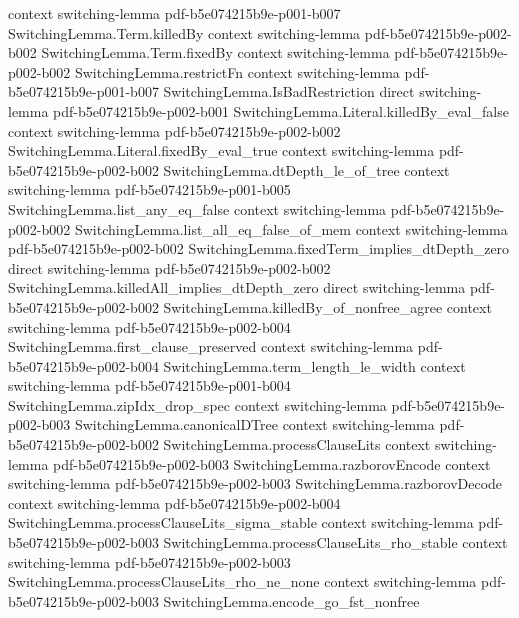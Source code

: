 \begin{lemma}
  {context}
  {switching-lemma}
  {pdf-b5e074215b9e-p001-b007}
\proofstep
  {SwitchingLemma.Term.killedBy}
  {context}
  {switching-lemma}
  {pdf-b5e074215b9e-p002-b002}
\proofstep
  {SwitchingLemma.Term.fixedBy}
  {context}
  {switching-lemma}
  {pdf-b5e074215b9e-p002-b002}
\proofstep
  {SwitchingLemma.restrictFn}
  {context}
  {switching-lemma}
  {pdf-b5e074215b9e-p001-b007}
\proofstep
  {SwitchingLemma.IsBadRestriction}
  {direct}
  {switching-lemma}
  {pdf-b5e074215b9e-p002-b001}
\proofstep
  {SwitchingLemma.Literal.killedBy_eval_false}
  {context}
  {switching-lemma}
  {pdf-b5e074215b9e-p002-b002}
\proofstep
  {SwitchingLemma.Literal.fixedBy_eval_true}
  {context}
  {switching-lemma}
  {pdf-b5e074215b9e-p002-b002}
\proofstep
  {SwitchingLemma.dtDepth_le_of_tree}
  {context}
  {switching-lemma}
  {pdf-b5e074215b9e-p001-b005}
\proofstep
  {SwitchingLemma.list_any_eq_false}
  {context}
  {switching-lemma}
  {pdf-b5e074215b9e-p002-b002}
\proofstep
  {SwitchingLemma.list_all_eq_false_of_mem}
  {context}
  {switching-lemma}
  {pdf-b5e074215b9e-p002-b002}
\proofstep
  {SwitchingLemma.fixedTerm_implies_dtDepth_zero}
  {direct}
  {switching-lemma}
  {pdf-b5e074215b9e-p002-b002}
\proofstep
  {SwitchingLemma.killedAll_implies_dtDepth_zero}
  {direct}
  {switching-lemma}
  {pdf-b5e074215b9e-p002-b002}
\proofstep
  {SwitchingLemma.killedBy_of_nonfree_agree}
  {context}
  {switching-lemma}
  {pdf-b5e074215b9e-p002-b004}
\proofstep
  {SwitchingLemma.first_clause_preserved}
  {context}
  {switching-lemma}
  {pdf-b5e074215b9e-p002-b004}
\proofstep
  {SwitchingLemma.term_length_le_width}
  {context}
  {switching-lemma}
  {pdf-b5e074215b9e-p001-b004}
\proofstep
  {SwitchingLemma.zipIdx_drop_spec}
  {context}
  {switching-lemma}
  {pdf-b5e074215b9e-p002-b003}
\proofstep
  {SwitchingLemma.canonicalDTree}
  {context}
  {switching-lemma}
  {pdf-b5e074215b9e-p002-b002}
\proofstep
  {SwitchingLemma.processClauseLits}
  {context}
  {switching-lemma}
  {pdf-b5e074215b9e-p002-b003}
\proofstep
  {SwitchingLemma.razborovEncode}
  {context}
  {switching-lemma}
  {pdf-b5e074215b9e-p002-b003}
\proofstep
  {SwitchingLemma.razborovDecode}
  {context}
  {switching-lemma}
  {pdf-b5e074215b9e-p002-b004}
\proofstep
  {SwitchingLemma.processClauseLits_sigma_stable}
  {context}
  {switching-lemma}
  {pdf-b5e074215b9e-p002-b003}
\proofstep
  {SwitchingLemma.processClauseLits_rho_stable}
  {context}
  {switching-lemma}
  {pdf-b5e074215b9e-p002-b003}
\proofstep
  {SwitchingLemma.processClauseLits_rho_ne_none}
  {context}
  {switching-lemma}
  {pdf-b5e074215b9e-p002-b003}
\proofstep
  {SwitchingLemma.encode_go_fst_nonfree}

\end{lemma}
